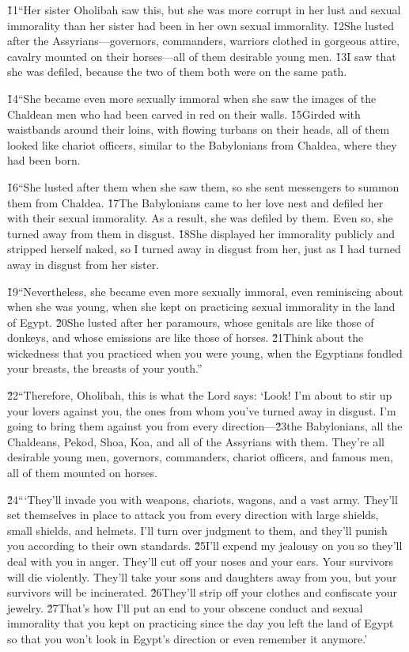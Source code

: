 \v{11}``Her sister Oholibah saw this, but she was more corrupt in her lust and sexual immorality than her sister had been in her own sexual immorality. \v{12}She lusted after the Assyrians---governors, commanders, warriors clothed in gorgeous attire, cavalry mounted on their horses---all of them desirable young men. \v{13}I saw that she was defiled, because the two of them both were on the same path.

\v{14}``She became even more sexually immoral when she saw the images of the Chaldean men who had been carved in red on their walls. \v{15}Girded with waistbands around their loins, with flowing turbans on their heads, all of them looked like chariot officers, similar to the Babylonians from Chaldea, where they had been born.

\v{16}``She lusted after them when she saw them, so she sent messengers to summon them from Chaldea. \v{17}The Babylonians came to her love nest and defiled her with their sexual immorality. As a result, she was defiled by them. Even so, she turned away from them in disgust. \v{18}She displayed her immorality publicly and stripped herself naked, so I turned away in disgust from her, just as I had turned away in disgust from her sister.

\v{19}``Nevertheless, she became even more sexually immoral, even reminiscing about when she was young, when she kept on practicing sexual immorality in the land of Egypt. \v{20}She lusted after her paramours, whose genitals are like those of donkeys, and whose emissions are like those of horses. \v{21}Think about the wickedness that you practiced when you were young, when the Egyptians fondled your breasts, the breasts of your youth.''

\v{22}``Therefore, Oholibah, this is what the Lord  says: `Look! I'm about to stir up your lovers against you, the ones from whom you've turned away in disgust. I'm going to bring them against you from every direction---\v{23}the Babylonians, all the Chaldeans, Pekod, Shoa, Koa, and all of the Assyrians with them. They're all desirable young men, governors, commanders, chariot officers, and famous men, all of them mounted on horses.

\v{24}```They'll invade you with weapons, chariots, wagons, and a vast army. They'll set themselves in place to attack you from every direction with large shields, small shields, and helmets. I'll turn over judgment to them, and they'll punish you according to their own standards. \v{25}I'll expend my jealousy on you so they'll deal with you in anger. They'll cut off your noses and your ears. Your survivors will die violently. They'll take your sons and daughters away from you, but your survivors will be incinerated. \v{26}They'll strip off your clothes and confiscate your jewelry. \v{27}That's how I'll put an end to your obscene conduct and sexual immorality that you kept on practicing since the day you left the land of Egypt so that you won't look in Egypt's direction or even remember it anymore.'

